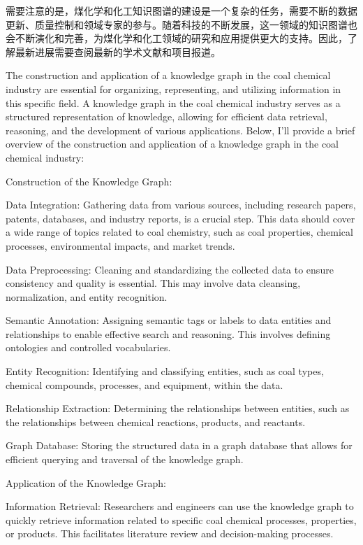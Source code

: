 需要注意的是，煤化学和化工知识图谱的建设是一个复杂的任务，需要不断的数据更新、质量控制和领域专家的参与。随着科技的不断发展，这一领域的知识图谱也会不断演化和完善，为煤化学和化工领域的研究和应用提供更大的支持。因此，了解最新进展需要查阅最新的学术文献和项目报道。


The construction and application of a knowledge graph in the coal chemical industry are essential for organizing, representing, and utilizing information in this specific field. A knowledge graph in the coal chemical industry serves as a structured representation of knowledge, allowing for efficient data retrieval, reasoning, and the development of various applications. Below, I'll provide a brief overview of the construction and application of a knowledge graph in the coal chemical industry:

Construction of the Knowledge Graph:

Data Integration: Gathering data from various sources, including research papers, patents, databases, and industry reports, is a crucial step. This data should cover a wide range of topics related to coal chemistry, such as coal properties, chemical processes, environmental impacts, and market trends.

Data Preprocessing: Cleaning and standardizing the collected data to ensure consistency and quality is essential. This may involve data cleansing, normalization, and entity recognition.

Semantic Annotation: Assigning semantic tags or labels to data entities and relationships to enable effective search and reasoning. This involves defining ontologies and controlled vocabularies.

Entity Recognition: Identifying and classifying entities, such as coal types, chemical compounds, processes, and equipment, within the data.

Relationship Extraction: Determining the relationships between entities, such as the relationships between chemical reactions, products, and reactants.

Graph Database: Storing the structured data in a graph database that allows for efficient querying and traversal of the knowledge graph.

Application of the Knowledge Graph:

Information Retrieval: Researchers and engineers can use the knowledge graph to quickly retrieve information related to specific coal chemical processes, properties, or products. This facilitates literature review and decision-making processes.

